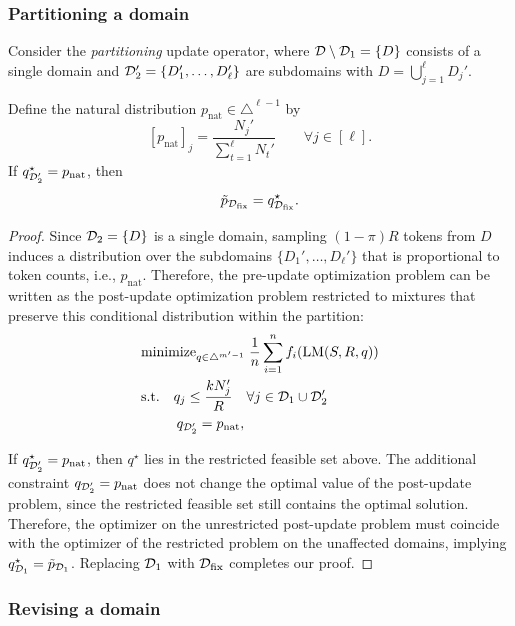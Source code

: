 \subsubsection{Partitioning a domain}

\begin{lemma}[When $\tilde{p}_{\Dfix} = q^\star_{\Dfix}$ for partitioning]\label{lem:part_exactness}
Consider the \emph{partitioning} update operator, where $\mathcal{D} \setminus \mathcal{D}_1 =\{D\}$ consists of a single domain and
$\mathcal{D}_2'=\{D_1',\dots,D_\ell'\}$ are subdomains with $D=\bigcup_{j=1}^\ell D_j'$.

Define the natural distribution $p_{\mathrm{nat}}\in\triangle^{\ell-1}$ by
\[
[p_{\mathrm{nat}}]_j = \frac{N_j'}{\sum_{t=1}^\ell N_t'} \qquad \forall j\in[\ell].
\]
If $q^\star_{\mathcal{D}_2'} = p_{\mathrm{nat}}$, then
\[
\tilde p_{\mathcal{D}_{\text{fix}}} = q^\star_{\mathcal{D}_{\text{fix}}}.
\]
\end{lemma}

\begin{proof}
Since $\mathcal{D}_2=\{D\}$ is a single domain, sampling $(1-\pi)R$ tokens from $D$ induces a distribution over the subdomains
$\{D_1',\dots,D_\ell'\}$ that is proportional to token counts, i.e., $p_{\mathrm{nat}}$.
Therefore, the pre-update optimization problem can be written as the post-update optimization problem restricted to mixtures that preserve this
conditional distribution within the partition:
\begin{align*}
    &\text{minimize}_{q\in\triangle^{m'-1}} \; \frac{1}{n} \sum_{i = 1}^n f_i(\text{LM}(S, R, q)) \\
    &\text{s.t.}\quad q_j \le \frac{kN_j'}{R}\quad \forall j\in\mathcal{D}_1 \cup\mathcal{D}_2' \\
    &\qquad\;\; q_{\mathcal{D}_2'} = p_{\mathrm{nat}},
\end{align*}

If $q^\star_{\mathcal{D}_2'}=p_{\mathrm{nat}}$, then $q^\star$ lies in the restricted feasible set above. The additional constraint
$q_{\mathcal{D}_2'}=p_{\mathrm{nat}}$ does not change the optimal value of the post-update problem, since the restricted feasible set still contains
the optimal solution. Therefore, the optimizer on the unrestricted post-update problem must coincide with the optimizer of the restricted problem on the
unaffected domains, implying $q^\star_{\mathcal{D}_1}=\tilde p_{\mathcal{D}_1}$. Replacing $\mathcal{D}_1$ with $\mathcal{D}_{\text{fix}}$ completes our proof.
\end{proof}

\subsubsection{Revising a domain}

